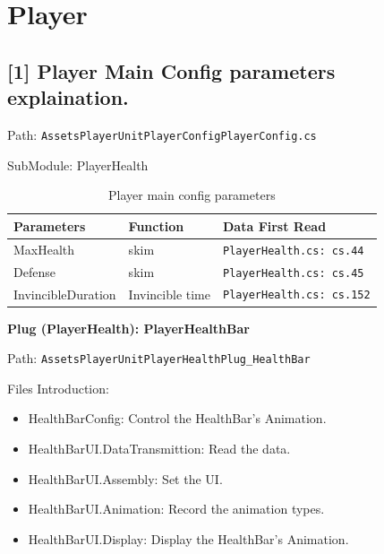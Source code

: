 
\section{Player}   %

\subsection{[1] Player Main Config parameters explaination.}

Path: \texttt{\bs Assets\bs PlayerUnit\bs PlayerConfig\bs PlayerConfig.cs}

SubModule: PlayerHealth

\begin{table}[htbp]
\centering
\begin{tabular}{lll}
\toprule
\textbf{Parameters} & \textbf{Function} & \textbf{Data First Read} \\
\midrule
MaxHealth & skim & \texttt{PlayerHealth.cs: cs.44} \\
Defense & skim & \texttt{PlayerHealth.cs: cs.45} \\
InvincibleDuration & Invincible time & \texttt{PlayerHealth.cs: cs.152} \\
\bottomrule
\end{tabular}
\caption{Player main config parameters}
\end{table}

\textbf{Plug (PlayerHealth): PlayerHealthBar}

Path: \texttt{\bs Assets\bs PlayerUnit\bs PlayerHealth\bs Plug\_HealthBar}

Files Introduction:

\begin{itemize}
  \item HealthBarConfig: Control the HealthBar's Animation.
  \item HealthBarUI.DataTransmittion: Read the data.
  \item HealthBarUI.Assembly: Set the UI.
  \item HealthBarUI.Animation: Record the animation types.
  \item HealthBarUI.Display: Display the HealthBar's Animation.
\end{itemize}

